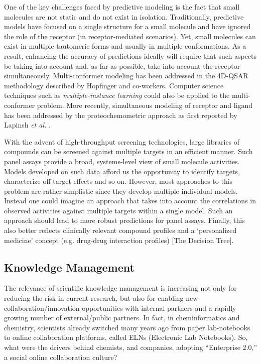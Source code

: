 \documentclass{sig-alternate}
\begin{document}
One of the key challenges faced by predictive modeling is the fact
that small molecules are not static and do not exist in
isolation. Traditionally, predictive models have focused on a single
structure for a small molecule and have ignored the role of the
receptor (in receptor-mediated scenarios). Yet, small molecules can
exist in multiple tautomeric forms and usually in multiple
conformations. As a result, enhancing the accuracy of predictions
ideally will require that such aspects be taking into account and, as
far as possible, take into account the receptor
simultaneously. Multi-conformer modeling has been addressed in the
4D-QSAR methodology described by Hopfinger and co-workers.  Computer
science techniques such as \emph{multiple-instance learning} could
also be applied to the multi-conformer problem. More recently,
simultaneous modeling of receptor and ligand has been addressed by the
proteochemometric approach as first reported by Lapinsh
\textit{et al.} \cite{lapinsh2001}.

With the advent of high-throughput screening technologies, large libraries of
compounds can be screened against multiple targets in an efficient manner. Such
panel assays provide a broad, systems-level view of small molecule activities.
Models developed on such data afford us the opportunity to identify targets,
characterize off-target effects and so on. However, most approaches to this
problem are rather simplistic since they develop multiple individual models.
Instead one could imagine an approach that takes into account the correlations
in observed activities against multiple targets within a single model. Such an
approach should lead to more robust predictions for panel assays. Finally,
this also better reflects clinically relevant compound profiles \cite{kuhn2010}
and a `personalized medicine' concept (e.g. drug-drug interaction profiles) [The
Decision Tree].

\subsection{Knowledge Management}
\label{sec:knowledge-management}

The relevance of scientific knowledge management is increasing not only for
reducing the risk in current research, but also for enabling new
collaboration/innovation opportunities with internal partners and a rapidly growing
number of external/public partners. In fact, in cheminformatics and chemistry,
scientists already switched many years ago from paper lab-notebooks to
online collaboration platforms, called ELNs (Electronic Lab Notebooks). So, what were the drivers behind chemists, and companies, adopting ``Enterprise 2.0,'' a social online collaboration culture? 
\end{document}
